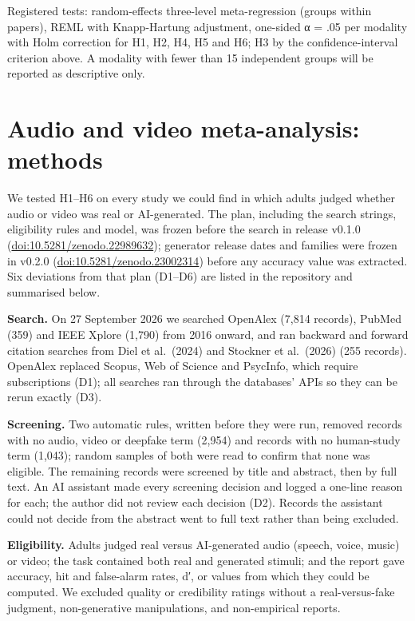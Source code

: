 \documentclass[11pt]{article}
\begin{document}
Registered tests: random-effects three-level meta-regression (groups
within papers), REML with Knapp-Hartung adjustment, one-sided α = .05
per modality with Holm correction for H1, H2, H4, H5 and H6; H3 by the
confidence-interval criterion above. A modality with fewer than 15
independent groups will be reported as descriptive only.

\hypertarget{audio-and-video-meta-analysis-methods}{%
\section{Audio and video meta-analysis:
methods}\label{audio-and-video-meta-analysis-methods}}

We tested H1--H6 on every study we could find in which adults judged
whether audio or video was real or AI-generated. The plan, including the
search strings, eligibility rules and model, was frozen before the
search in release v0.1.0
(\href{https://doi.org/10.5281/zenodo.22989632}{doi:10.5281/zenodo.22989632});
generator release dates and families were frozen in v0.2.0
(\href{https://doi.org/10.5281/zenodo.23002314}{doi:10.5281/zenodo.23002314})
before any accuracy value was extracted. Six deviations from that plan
(D1--D6) are listed in the repository and summarised below.

\textbf{Search.} On 27 September 2026 we searched OpenAlex (7,814
records), PubMed (359) and IEEE Xplore (1,790) from 2016 onward, and ran
backward and forward citation searches from Diel et al.~(2024) and
Stockner et al.~(2026) (255 records). OpenAlex replaced Scopus, Web of
Science and PsycInfo, which require subscriptions (D1); all searches ran
through the databases' APIs so they can be rerun exactly (D3).

\textbf{Screening.} Two automatic rules, written before they were run,
removed records with no audio, video or deepfake term (2,954) and
records with no human-study term (1,043); random samples of both were
read to confirm that none was eligible. The remaining records were
screened by title and abstract, then by full text. An AI assistant made
every screening decision and logged a one-line reason for each; the
author did not review each decision (D2). Records the assistant could
not decide from the abstract went to full text rather than being
excluded.

\textbf{Eligibility.} Adults judged real versus AI-generated audio
(speech, voice, music) or video; the task contained both real and
generated stimuli; and the report gave accuracy, hit and false-alarm
rates, d′, or values from which they could be computed. We excluded
quality or credibility ratings without a real-versus-fake judgment,
non-generative manipulations, and non-empirical reports.
\end{document}
